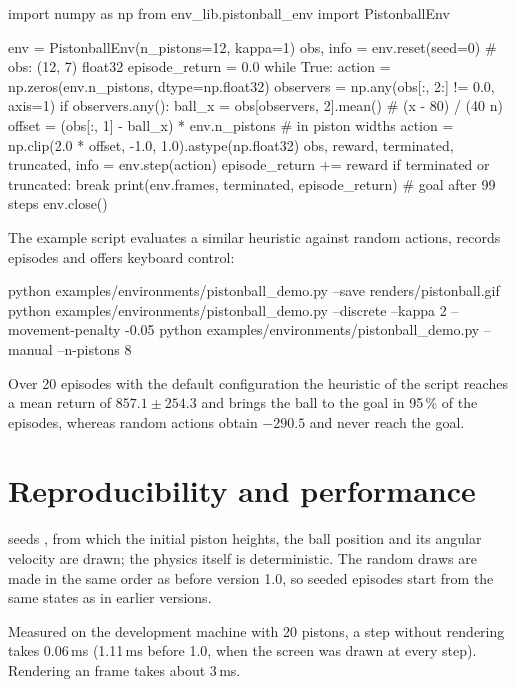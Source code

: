 \begin{pycode}
import numpy as np
from env_lib.pistonball_env import PistonballEnv

env = PistonballEnv(n_pistons=12, kappa=1)
obs, info = env.reset(seed=0)                     # obs: (12, 7) float32
episode_return = 0.0
while True:
    action = np.zeros(env.n_pistons, dtype=np.float32)
    observers = np.any(obs[:, 2:] != 0.0, axis=1)
    if observers.any():
        ball_x = obs[observers, 2].mean()          # (x - 80) / (40 n)
        offset = (obs[:, 1] - ball_x) * env.n_pistons  # in piston widths
        action = np.clip(2.0 * offset, -1.0, 1.0).astype(np.float32)
    obs, reward, terminated, truncated, info = env.step(action)
    episode_return += reward
    if terminated or truncated:
        break
print(env.frames, terminated, episode_return)     # goal after 99 steps
env.close()
\end{pycode}

The example script evaluates a similar heuristic against random actions,
records episodes and offers keyboard control:

\begin{shellcode}
python examples/environments/pistonball_demo.py --save renders/pistonball.gif
python examples/environments/pistonball_demo.py --discrete --kappa 2 --movement-penalty -0.05
python examples/environments/pistonball_demo.py --manual --n-pistons 8
\end{shellcode}

Over 20 episodes with the default configuration the heuristic of the script
reaches a mean return of $857.1 \pm 254.3$ and brings the ball to the goal in
95\,\% of the episodes, whereas random actions obtain $-290.5$ and never reach
the goal.

\section{Reproducibility and performance}\label{sec:pistonball-perf}

 seeds , from which the initial
piston heights, the ball position and its angular velocity are drawn; the
physics itself is deterministic. The random draws are made in the same order as
before version 1.0, so seeded episodes start from the same states as in earlier
versions.

Measured on the development machine with 20 pistons, a step without rendering
takes 0.06\,ms (1.11\,ms before 1.0, when the screen was drawn at every step).
Rendering an  frame takes about 3\,ms.

